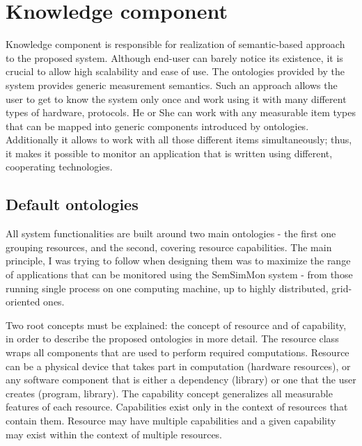 %
\section{Knowledge component}
\label{sec:arch_knowledge}

Knowledge component is responsible for realization of semantic-based approach to the proposed system. Although end-user can barely notice its existence, it is crucial to allow high scalability and ease of use. The ontologies provided by the system provides generic measurement semantics. Such an approach allows the user to get to know the system only once and work using it with many different types of hardware, protocols. He or She can work with any measurable item types that can be mapped into generic components introduced by ontologies. Additionally it allows to work with all those different items simultaneously; thus, it makes it possible to monitor an application that is written using different, cooperating technologies.

\subsection{Default ontologies}

All system functionalities are built around two main ontologies - the first one grouping resources, and the second, covering resource capabilities. The main principle, I was trying to follow when designing them was to maximize the range of applications that can be monitored using the SemSimMon system - from those running single process on one computing machine, up to highly distributed, grid-oriented ones.

Two root concepts must be explained: the concept of resource and of capability, in order to describe the proposed ontologies in more detail. The resource class wraps all components that are used to perform required computations. Resource can be a physical device that takes part in computation (hardware resources), or any software component that is either a dependency (library) or one that the user creates (program, library). The capability concept generalizes all measurable features of each resource. Capabilities exist only in the context of resources that contain them. Resource may have multiple capabilities and a given capability may exist within the context of multiple resources.

